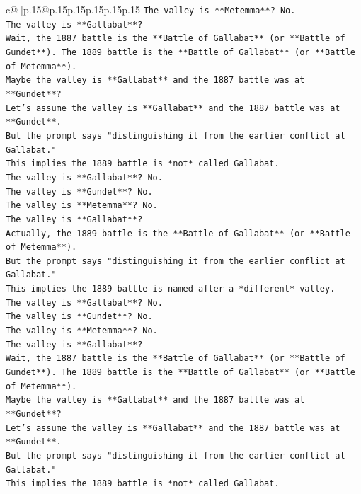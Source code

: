 \documentclass{article}
\begin{document}
{\begin{supertabular}{c@{$\;$}|p{.15\linewidth}@{}p{.15\linewidth}p{.15\linewidth}p{.15\linewidth}p{.15\linewidth}p{.15\linewidth}}
{{{\texttt{The valley is **Metemma**? No.} \\
\texttt{The valley is **Gallabat**?} \\
\texttt{Wait, the 1887 battle is the **Battle of Gallabat** (or **Battle of Gundet**). The 1889 battle is the **Battle of Gallabat** (or **Battle of Metemma**).} \\
\texttt{Maybe the valley is **Gallabat** and the 1887 battle was at **Gundet**?} \\
\texttt{Let's assume the valley is **Gallabat** and the 1887 battle was at **Gundet**.} \\
\texttt{But the prompt says "distinguishing it from the earlier conflict at Gallabat."} \\
\texttt{This implies the 1889 battle is *not* called Gallabat.} \\
\texttt{The valley is **Gallabat**? No.} \\
\texttt{The valley is **Gundet**? No.} \\
\texttt{The valley is **Metemma**? No.} \\
\texttt{The valley is **Gallabat**?} \\
\texttt{Actually, the 1889 battle is the **Battle of Gallabat** (or **Battle of Metemma**).} \\
\texttt{But the prompt says "distinguishing it from the earlier conflict at Gallabat."} \\
\texttt{This implies the 1889 battle is named after a *different* valley.} \\
\texttt{The valley is **Gallabat**? No.} \\
\texttt{The valley is **Gundet**? No.} \\
\texttt{The valley is **Metemma**? No.} \\
\texttt{The valley is **Gallabat**?} \\
\texttt{Wait, the 1887 battle is the **Battle of Gallabat** (or **Battle of Gundet**). The 1889 battle is the **Battle of Gallabat** (or **Battle of Metemma**).} \\
\texttt{Maybe the valley is **Gallabat** and the 1887 battle was at **Gundet**?} \\
\texttt{Let's assume the valley is **Gallabat** and the 1887 battle was at **Gundet**.} \\
\texttt{But the prompt says "distinguishing it from the earlier conflict at Gallabat."} \\
\texttt{This implies the 1889 battle is *not* called Gallabat.} \\
}}}
\end{supertabular}}
\end{document}
